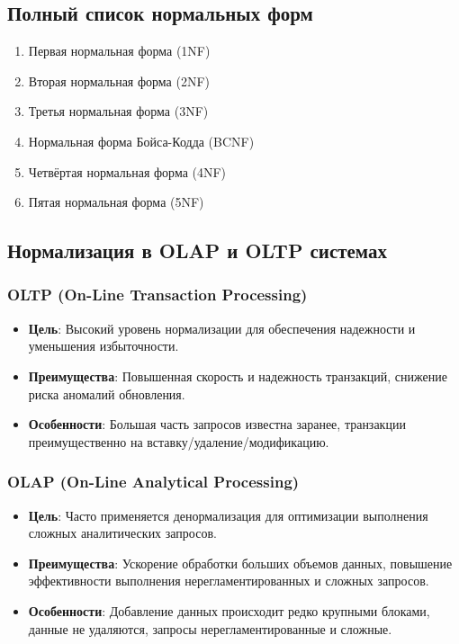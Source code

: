 \documentclass[a4paper,12pt]{article}
\begin{document}
\subsection{Полный список нормальных форм}

\begin{enumerate}
    \item Первая нормальная форма (1NF)
    \item Вторая нормальная форма (2NF)
    \item Третья нормальная форма (3NF)
    \item Нормальная форма Бойса-Кодда (BCNF)
    \item Четвёртая нормальная форма (4NF)
    \item Пятая нормальная форма (5NF)
\end{enumerate}

\subsection{Нормализация в OLAP и OLTP системах}

\subsubsection{OLTP (On-Line Transaction Processing)}

\begin{itemize}
    \item \textbf{Цель}: Высокий уровень нормализации для обеспечения надежности и уменьшения избыточности.
    \item \textbf{Преимущества}: Повышенная скорость и надежность транзакций, снижение риска аномалий обновления.
    \item \textbf{Особенности}: Большая часть запросов известна заранее, транзакции преимущественно на вставку/удаление/модификацию.
\end{itemize}

\subsubsection{OLAP (On-Line Analytical Processing)}

\begin{itemize}
    \item \textbf{Цель}: Часто применяется денормализация для оптимизации выполнения сложных аналитических запросов.
    \item \textbf{Преимущества}: Ускорение обработки больших объемов данных, повышение эффективности выполнения нерегламентированных и сложных запросов.
    \item \textbf{Особенности}: Добавление данных происходит редко крупными блоками, данные не удаляются, запросы нерегламентированные и сложные.
\end{itemize}
\end{document}
